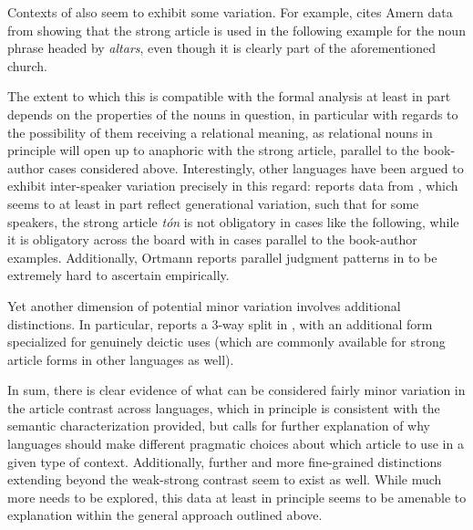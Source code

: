 \documentclass[output=paper
,modfonts
,nonflat]{langscibook}
\begin{document}
Contexts of   also seem to exhibit some
variation. For example, \citet{Wespel2008} cites Amern data from \citet{Heinrichs1954} showing
that the strong article is used in the following example for the noun phrase headed by
\textit{altars}, even though it is clearly part of the aforementioned church.


The extent to which this is compatible with the formal analysis at
least in part depends on the properties of the nouns in question, in
particular with regards to the possibility of them receiving a
relational meaning, as relational nouns in principle will open up to
anaphoric  with the strong article, parallel to the
book-author cases considered above. Interestingly, other languages
have been argued to exhibit inter-speaker variation precisely in
this regard: \citet{Ortmann2014}  reports data from ,
which seems to at least in part reflect generational
  variation, such that for some speakers, the strong article
  \textit{t\'on} is not obligatory in cases like the following, while
  it is obligatory across the board with in cases parallel to the
  book-author examples. Additionally, Ortmann reports parallel judgment
patterns in  to be extremely hard to ascertain empirically.

Yet another dimension of potential minor variation involves additional
distinctions. In particular, \citet{Ahn2016} reports a 3-way split in
, with an additional form specialized for genuinely deictic uses
(which are commonly available for strong article forms in other
languages as well).

In sum, there is clear evidence of what can be considered fairly minor
variation in the article contrast across languages, which in principle
is consistent with the semantic characterization provided, but calls
for further explanation of why languages should make different
pragmatic choices about which article to use in a given type of
context. Additionally, further and more fine-grained distinctions
extending beyond the weak-strong contrast seem to exist as
well. While much more needs to be explored, this data at least in
principle seems to be amenable to explanation within the general
approach outlined above.
\end{document}
